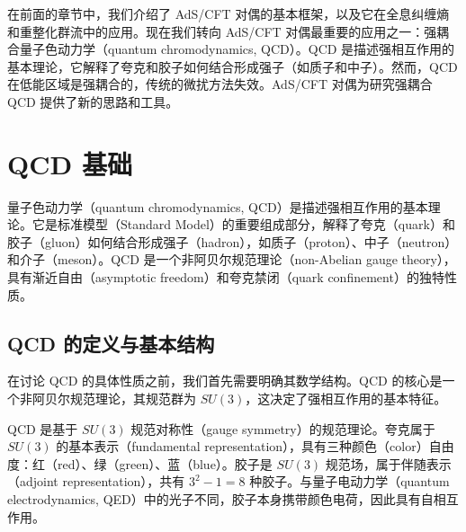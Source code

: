 
在前面的章节中，我们介绍了 AdS/CFT 对偶的基本框架，以及它在全息纠缠熵和重整化群流中的应用。现在我们转向 AdS/CFT 对偶最重要的应用之一：强耦合量子色动力学（quantum chromodynamics, QCD）。QCD 是描述强相互作用的基本理论，它解释了夸克和胶子如何结合形成强子（如质子和中子）。然而，QCD 在低能区域是强耦合的，传统的微扰方法失效。AdS/CFT 对偶为研究强耦合 QCD 提供了新的思路和工具。

\section{QCD 基础}

量子色动力学（quantum chromodynamics, QCD）是描述强相互作用的基本理论。它是标准模型（Standard Model）的重要组成部分，解释了夸克（quark）和胶子（gluon）如何结合形成强子（hadron），如质子（proton）、中子（neutron）和介子（meson）。QCD 是一个非阿贝尔规范理论（non-Abelian gauge theory），具有渐近自由（asymptotic freedom）和夸克禁闭（quark confinement）的独特性质。

\subsection{QCD 的定义与基本结构}

在讨论 QCD 的具体性质之前，我们首先需要明确其数学结构。QCD 的核心是一个非阿贝尔规范理论，其规范群为 $SU(3)$，这决定了强相互作用的基本特征。

\begin{definition}[量子色动力学]
QCD 是基于 $SU(3)$ 规范对称性（gauge symmetry）的规范理论。夸克属于 $SU(3)$ 的基本表示（fundamental representation），具有三种颜色（color）自由度：红（red）、绿（green）、蓝（blue）。胶子是 $SU(3)$ 规范场，属于伴随表示（adjoint representation），共有 $3^2 - 1 = 8$ 种胶子。与量子电动力学（quantum electrodynamics, QED）中的光子不同，胶子本身携带颜色电荷，因此具有自相互作用。
\end{definition}

